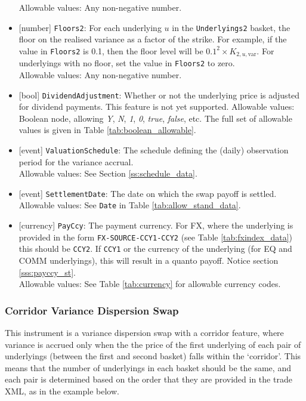 \begin{itemize}
  Allowable values: Any non-negative number.
  \item{}[number] \lstinline!Floors2!: For each underlying $u$ in the \lstinline!Underlyings2! basket, the floor on the realised
  variance as a factor of the strike. For example, if the value in \lstinline!Floors2! is 0.1, then the floor level will
  be $0.1^2 \times K_{2,u,\text{var}}$. For underlyings with no floor, set the value in \lstinline!Floors2! to zero. \\
  Allowable values: Any non-negative number.
  \item{}[bool] \lstinline!DividendAdjustment!: Whether or not the underlying price is adjusted for dividend payments. This feature is
  not yet supported.
  Allowable values: Boolean node, allowing \emph{Y}, \emph{N}, \emph{1}, \emph{0}, \emph{true}, \emph{false}, etc.
  The full set of allowable values is given in Table \ref{tab:boolean_allowable}.
  \item{}[event] \lstinline!ValuationSchedule!: The schedule defining the (daily) observation period for the variance accrual. \\
  Allowable values: See Section \ref{ss:schedule_data}.
  \item{}[event] \lstinline!SettlementDate!: The date on which the swap payoff is settled. \\
  Allowable values: See \lstinline!Date! in Table \ref{tab:allow_stand_data}.
  \item{}[currency] \lstinline!PayCcy!: The payment currency. For FX, where the underlying is provided
      in the form \lstinline!FX-SOURCE-CCY1-CCY2! (see Table \ref{tab:fxindex_data}) this should
      be \lstinline!CCY2!. If \lstinline!CCY1! or the currency of the underlying (for EQ and
      COMM underlyings), this will result in a quanto payoff. Notice section \ref{sss:payccy_st}. \\
        Allowable values: See Table \ref{tab:currency} for allowable currency codes.
\end{itemize}

\subsubsection*{Corridor Variance Dispersion Swap}

This instrument is a variance dispersion swap with a corridor feature, where variance is accrued only when the
the price of the first underlying of each pair of underlyings (between the first and second basket) falls within
the `corridor'. This means that the number of underlyings in each basket should be the same, and each pair is
determined based on the order that they are provided in the trade XML, as in the example below.

